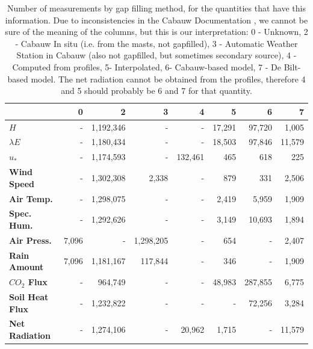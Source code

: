 \documentclass[a4paper]{book}
\begin{document}
\begin{table}[]
\centering
\caption{Number of measurements by gap filling method, for the quantities that have this information. Due to inconsistencies in the Cabauw Documentation \citep{cabauw_gapfilling}, we cannot be sure of the meaning of the columns, but this is our interpretation: 0 - Unknown, 2 - Cabauw In situ (i.e. from the masts, not gapfilled), 3 - Automatic Weather Station in Cabauw (also not gapfilled, but sometimes secondary source), 4 - Computed from profiles, 5- Interpolated, 6- Cabauw-based model, 7 - De Bilt-based model. The net radiation cannot be obtained from the profiles, therefore 4 and 5 should probably be 6 and 7 for that quantity.}
\label{tbl:col_gapfilled}
\begin{tabular*}{\textwidth}{l| @{\extracolsep{\fill}} rrrrrrr}
\toprule
& \textbf{0} & \textbf{2} & \textbf{3} & \textbf{4} & \textbf{5}  & \textbf{6}  & \textbf{7} \\ \midrule
\textbf{$H$} & - &  1,192,346 & - & - &  17,291 &  97,720 &  1,005 \\
\textbf{$\lambda E$} & - &  1,180,434 & - & - &  18,503 &  97,846 &  11,579 \\
\textbf{$u_*$} & - &  1,174,593 & - &  132,461 &  465 &  618 &  225 \\
\textbf{Wind Speed} & - &  1,302,308 &  2,338 & - &  879 &  331 &  2,506 \\
\textbf{Air Temp.} & - &  1,298,075 & - & - &  2,419 &  5,959 &  1,909 \\
\textbf{Spec. Hum.} & - &  1,292,626 & - & - &  3,149 &  10,693 &  1,894 \\
\textbf{Air Press.} &  7,096 & - &  1,298,205 & - &  654 & - &  2,407 \\
\textbf{Rain Amount} &  7,096 &  1,181,167 &  117,844 & - &  346 & - &  1,909 \\
\textbf{$CO_2$ Flux} & - &  964,749 & - & - &  48,983 &  287,855 &  6,775 \\
\textbf{Soil Heat Flux} & - &  1,232,822 & - & - & - &  72,256 &  3,284 \\
\textbf{Net Radiation} & - &  1,274,106 & -&  20,962 &  1,715 & - &  11,579 \\
\bottomrule
\end{tabular*}
\end{table}
\end{document}
